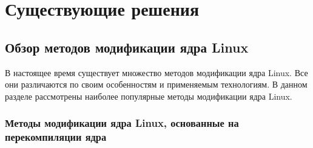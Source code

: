 \chapter{Существующие решения}\label{ch:--}
\section{Обзор методов модификации ядра Linux}\label{sec:----linux}

В настоящее время существует множество методов модификации ядра Linux.
Все они различаются по своим особенностям и применяемым технологиям.
В данном разделе рассмотрены наиболее популярные методы модификации ядра Linux.

\subsection{Методы модификации ядра Linux, основанные на перекомпиляции ядра}\label{subsec:---linux----}

